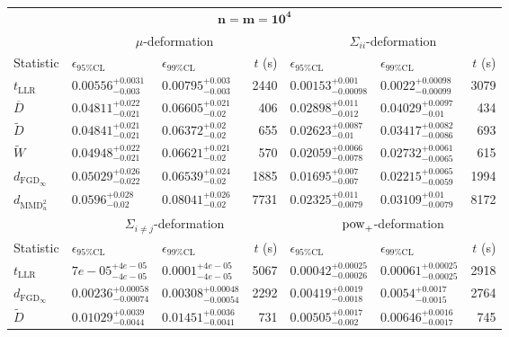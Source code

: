 \begin{tabular}{l|llr|llr}
	\toprule
	\multicolumn{7}{c}{$\mathbf{n=m=10^{4}}$} \\
	\multicolumn{1}{c}{} & \multicolumn{3}{c}{$\mu$-deformation} & \multicolumn{3}{c}{$\Sigma_{ii}$-deformation} \\
	Statistic & $\epsilon_{95\%\mathrm{CL}}$ & $\epsilon_{99\%\mathrm{CL}}$ & $t$ (s) & $\epsilon_{95\%\mathrm{CL}}$ & $\epsilon_{99\%\mathrm{CL}}$ & $t$ (s) \\
	\midrule
	$t_{\mathrm{LLR}}$ & $0.00556_{-0.003}^{+0.0031}$ & $0.00795_{-0.003}^{+0.003}$ & 2440 & $0.00153_{-0.00098}^{+0.001}$ & $0.0022_{-0.00099}^{+0.00098}$ & 3079 \\
	$\overline{D}$ & $0.04811_{-0.021}^{+0.022}$ & $0.06605_{-0.02}^{+0.021}$ & 406 & $0.02898_{-0.012}^{+0.011}$ & $0.04029_{-0.01}^{+0.0097}$ & 434 \\
	$\widetilde{D}$ & $0.04841_{-0.021}^{+0.021}$ & $0.06372_{-0.02}^{+0.02}$ & 655 & $0.02623_{-0.01}^{+0.0087}$ & $0.03417_{-0.0086}^{+0.0082}$ & 693 \\
	$\widetilde{W}$ & $0.04948_{-0.021}^{+0.022}$ & $0.06621_{-0.02}^{+0.021}$ & 570 & $0.02059_{-0.0078}^{+0.0066}$ & $0.02732_{-0.0065}^{+0.0061}$ & 615 \\
	$d_{\mathrm{FGD}_{\infty}}$ & $0.05029_{-0.022}^{+0.026}$ & $0.06539_{-0.02}^{+0.024}$ & 1885 & $0.01695_{-0.007}^{+0.007}$ & $0.02215_{-0.0059}^{+0.0065}$ & 1994 \\
	$d_{\mathrm{MMD}^{2}_{u}}$ & $0.0596_{-0.02}^{+0.028}$ & $0.08041_{-0.02}^{+0.026}$ & 7731 & $0.02325_{-0.0079}^{+0.011}$ & $0.03109_{-0.0079}^{+0.01}$ & 8172 \\
	\toprule
	\multicolumn{1}{c}{} & \multicolumn{3}{c}{$\Sigma_{i\neq j}$-deformation} & \multicolumn{3}{c}{$\rm{pow}_{+}$-deformation} \\
	Statistic & $\epsilon_{95\%\mathrm{CL}}$ & $\epsilon_{99\%\mathrm{CL}}$ & $t$ (s) & $\epsilon_{95\%\mathrm{CL}}$ & $\epsilon_{99\%\mathrm{CL}}$ & $t$ (s) \\
	\midrule
	$t_{\mathrm{LLR}}$ & $7e-05_{-4e-05}^{+4e-05}$ & $0.0001_{-4e-05}^{+4e-05}$ & 5067 & $0.00042_{-0.00026}^{+0.00025}$ & $0.00061_{-0.00025}^{+0.00025}$ & 2918 \\
	$d_{\mathrm{FGD}_{\infty}}$ & $0.00236_{-0.00074}^{+0.00058}$ & $0.00308_{-0.00054}^{+0.00048}$ & 2292 & $0.00419_{-0.0018}^{+0.0019}$ & $0.0054_{-0.0015}^{+0.0017}$ & 2764 \\
	$\widetilde{D}$ & $0.01029_{-0.0044}^{+0.0039}$ & $0.01451_{-0.0041}^{+0.0036}$ & 731 & $0.00505_{-0.002}^{+0.0017}$ & $0.00646_{-0.0017}^{+0.0016}$ & 745 \\

\end{tabular}

